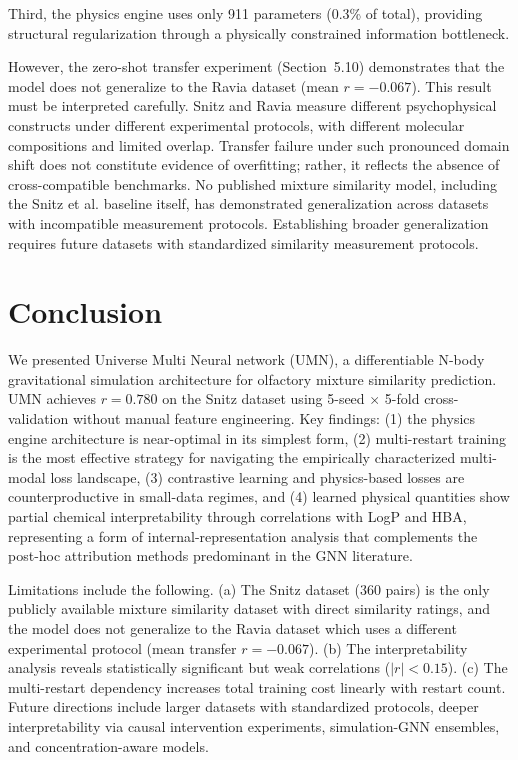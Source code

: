 \documentclass[11pt,a4paper]{article}
\begin{document}
Third, the physics engine uses only 911 parameters (0.3\% of total), providing structural regularization through a physically constrained information bottleneck.

However, the zero-shot transfer experiment (Section~5.10) demonstrates that the model does not generalize to the Ravia dataset (mean $r = -0.067$). This result must be interpreted carefully. Snitz and Ravia measure different psychophysical constructs under different experimental protocols, with different molecular compositions and limited overlap. Transfer failure under such pronounced domain shift does not constitute evidence of overfitting; rather, it reflects the absence of cross-compatible benchmarks. No published mixture similarity model, including the Snitz et al. baseline itself, has demonstrated generalization across datasets with incompatible measurement protocols. Establishing broader generalization requires future datasets with standardized similarity measurement protocols.

\section{Conclusion}

We presented Universe Multi Neural network (UMN), a differentiable N-body gravitational simulation architecture for olfactory mixture similarity prediction. UMN achieves $r = 0.780$ on the Snitz dataset using 5-seed $\times$ 5-fold cross-validation without manual feature engineering. Key findings: (1) the physics engine architecture is near-optimal in its simplest form, (2) multi-restart training is the most effective strategy for navigating the empirically characterized multi-modal loss landscape, (3) contrastive learning and physics-based losses are counterproductive in small-data regimes, and (4) learned physical quantities show partial chemical interpretability through correlations with LogP and HBA, representing a form of internal-representation analysis that complements the post-hoc attribution methods predominant in the GNN literature.

Limitations include the following. (a) The Snitz dataset (360 pairs) is the only publicly available mixture similarity dataset with direct similarity ratings, and the model does not generalize to the Ravia dataset which uses a different experimental protocol (mean transfer $r = -0.067$). (b) The interpretability analysis reveals statistically significant but weak correlations ($|r| < 0.15$). (c) The multi-restart dependency increases total training cost linearly with restart count. Future directions include larger datasets with standardized protocols, deeper interpretability via causal intervention experiments, simulation-GNN ensembles, and concentration-aware models.
\end{document}

